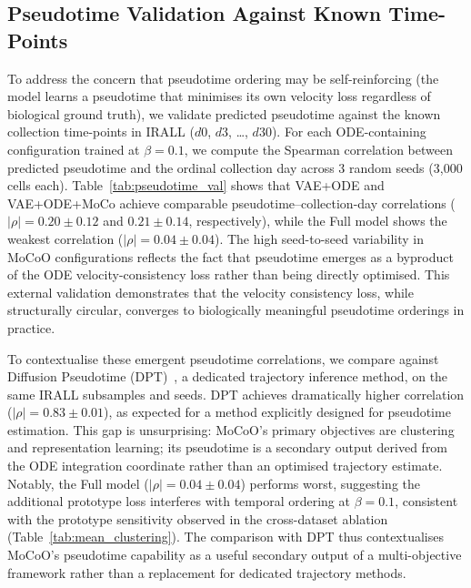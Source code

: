 \documentclass[biology,article,submit,pdftex]{Definitions/mdpi}
\begin{document}
\subsection{Pseudotime Validation Against Known Time-Points}
\label{sec:results:pseudotime}

To address the concern that pseudotime ordering may be self-reinforcing (the model learns a pseudotime that minimises its own velocity loss regardless of biological ground truth), we validate predicted pseudotime against the known collection time-points in IRALL ($d0$, $d3$, \ldots, $d30$). For each ODE-containing configuration trained at $\beta{=}0.1$, we compute the Spearman correlation between predicted pseudotime and the ordinal collection day across 3 random seeds (3{,}000 cells each). Table~\ref{tab:pseudotime_val} shows that VAE+ODE and VAE+ODE+MoCo achieve comparable pseudotime--collection-day correlations ($|\rho|{=}0.20{\pm}0.12$ and $0.21{\pm}0.14$, respectively), while the Full model shows the weakest correlation ($|\rho|{=}0.04{\pm}0.04$). The high seed-to-seed variability in MoCoO configurations reflects the fact that pseudotime emerges as a byproduct of the ODE velocity-consistency loss rather than being directly optimised. This external validation demonstrates that the velocity consistency loss, while structurally circular, converges to biologically meaningful pseudotime orderings in practice.

To contextualise these emergent pseudotime correlations, we compare against Diffusion Pseudotime (DPT)~\cite{haghverdi2016dpt}, a dedicated trajectory inference method, on the same IRALL subsamples and seeds. DPT achieves dramatically higher correlation ($|\rho|{=}0.83{\pm}0.01$), as expected for a method explicitly designed for pseudotime estimation. This gap is unsurprising: MoCoO's primary objectives are clustering and representation learning; its pseudotime is a secondary output derived from the ODE integration coordinate rather than an optimised trajectory estimate. Notably, the Full model ($|\rho|{=}0.04{\pm}0.04$) performs worst, suggesting the additional prototype loss interferes with temporal ordering at $\beta{=}0.1$, consistent with the prototype sensitivity observed in the cross-dataset ablation (Table~\ref{tab:mean_clustering}). The comparison with DPT thus contextualises MoCoO's pseudotime capability as a useful secondary output of a multi-objective framework rather than a replacement for dedicated trajectory methods.
\end{document}
